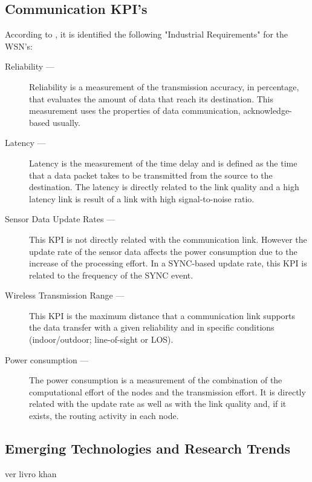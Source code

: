 \subsection{Communication KPI’s}

According to \cite{Radmand2010}, it is identified the following "Industrial Requirements" for the WSN's:

\begin{description}
	\item[Reliability ---] Reliability is a measurement of the transmission accuracy, in percentage, that evaluates the amount of data that reach its destination. This measurement uses the properties of data communication, acknowledge-based usually.
	
	\item[Latency ---] Latency is the measurement of the time delay and is defined as the time that a data packet takes to be transmitted from the source to the destination. The latency is directly related to the link quality and a high latency link is result of a link with high signal-to-noise ratio. 
	
	\item[Sensor Data Update Rates ---] This KPI is not directly related with the communication link. However the update rate of the sensor data affects the power consumption due to the increase of the processing effort. In a SYNC-based update rate, this KPI is related to the frequency of the SYNC event.
	
	\item[Wireless Transmission Range ---] This KPI is the maximum distance that a communication link supports the data transfer with a given reliability and in specific conditions (indoor/outdoor; line-of-sight or LOS).
	
	\item[Power consumption ---] The power consumption is a measurement of the combination of the computational effort of the nodes and the transmission effort. It is directly related with the update rate as well as with the link quality and, if it exists, the routing activity in each node.
	
\end{description}

\subsection{Emerging Technologies and Research Trends}

ver livro khan

